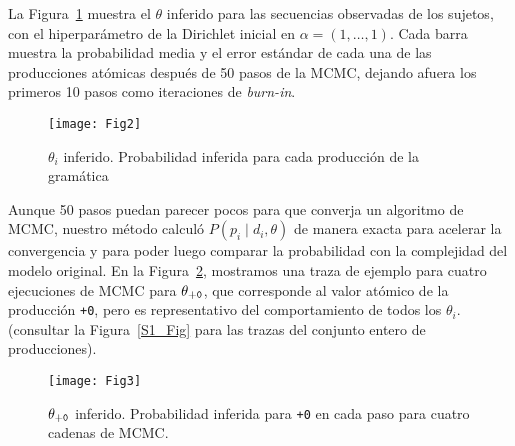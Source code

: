 
La Figura~\ref{fig:inferredtheta} muestra el $\theta$ inferido para las secuencias observadas de los sujetos, con el hiperparámetro de la Dirichlet inicial en $\alpha = (1, \dots, 1)$. Cada barra muestra la probabilidad media y el error estándar de cada una de las producciones atómicas después de 50 pasos de la MCMC, dejando afuera los primeros 10 pasos como iteraciones de \textit{burn-in}.

\begin{figure}[htpb]
    \centering
    \texttt{[image: Fig2]}
    \caption{$\theta_i$ inferido. Probabilidad inferida para cada producción de la gramática}
    \label{fig:inferredtheta}
\end{figure}

Aunque 50 pasos puedan parecer pocos para que converja un algoritmo de MCMC, nuestro método calculó $P(p_i \mid d_i, \theta)$ de manera exacta para acelerar la convergencia y para poder luego comparar la probabilidad con la complejidad \mdlgeo del modelo original. En la Figura~\ref{fig:convergetheta}, mostramos una traza de ejemplo para cuatro ejecuciones de MCMC para $\theta_{{\tt +0}}$, que corresponde al valor atómico de la producción \verb#+0#, pero es representativo del comportamiento de todos los $\theta_i$. (consultar la Figura~\ref{S1_Fig} para las trazas del conjunto entero de producciones).

\begin{figure}[htpb]
    \centering
    \texttt{[image: Fig3]}
    \caption{$\theta_{{\tt +0}}$ inferido. Probabilidad inferida para {\tt +0} en cada paso para cuatro cadenas de MCMC.}
    \label{fig:convergetheta}
\end{figure}


